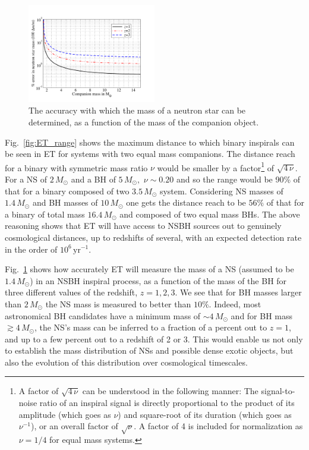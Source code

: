 \begin{figure}
\vskip -0.3cm
\centering
\includegraphics[angle=0,width=0.5\textwidth]{./Sec_ET_ScienceCase/NSmass.pdf}
\caption{The accuracy with which the mass of a neutron star can be 
determined, as a function of the mass of the companion object.}
\label{fig:NS_MassAccuracy}
\end{figure}
Fig.~\ref{fig:ET_range} shows the maximum distance
to which binary inspirals can be seen in ET for systems
with two equal mass companions. The distance reach for a binary
with symmetric mass ratio $\nu$ would be smaller by a 
factor\footnote{A factor of $\sqrt{4\,\nu}$ can be understood in
the following manner: The signal-to-noise ratio of an inspiral
signal is directly proportional to the product of its amplitude 
(which goes as $\nu$) and square-root of its duration (which
goes as $\nu^{-1}$), or an overall factor of $\sqrt{\nu}.$ A
factor of 4 is included for normalization as $\nu=1/4$ for equal
mass systems.} of $\sqrt{4\,\nu}$. For a NS of $2\,M_\odot$ and a
BH of $5\,M_\odot,$ $\nu\sim 0.20$ and so the range would be 
90\% of that for a binary composed of two $3.5\,M_\odot$ system.
Considering NS masses of $1.4\,M_\odot$ and BH masses of $10\,M_\odot$
one gets the distance reach to be $56\%$ of that for a binary
of total mass $16.4\,M_\odot$ and composed of two equal mass
BHs.  The above reasoning shows that ET will have access
to NSBH sources out to genuinely cosmological distances, up to
redshifts of several, with an expected detection rate in the
order of $10^6\,\mbox{yr}^{-1}$. 

Fig.~\ref{fig:NS_MassAccuracy}
shows how accurately ET will measure the mass of a NS 
(assumed to be $1.4\,M_\odot$) in an NSBH
inspiral process, as a function of the mass of the BH for three
different values of the redshift, $z=1,2,3.$ We see that for BH masses 
larger than $2\,M_\odot$ the NS mass is measured to better than
$10\%.$ Indeed, most astronomical BH candidates have a 
minimum mass of $\sim 4\,M_\odot$ and for BH mass $\gtrsim 4\,M_\odot$, 
the NS's mass can be inferred to a fraction of a percent out to
$z=1$, and up to a few percent out to a redshift of 2 or 3. This
would enable us not only to establish the mass distribution of
NSs and possible dense exotic objects, but also the 
evolution of this distribution over cosmological timescales.

